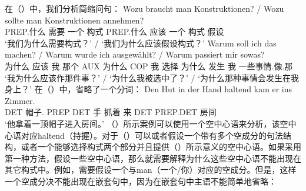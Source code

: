 \begin{exe}
\begin{xlist}[iv.]
\begin{exe}
\begin{xlist}[iv.]
\z
在（）中，我们分析简缩问句：
\eal
\ex 
\gll Wozu braucht man Konstruktionen? / Wozu sollte man Konstruktionen annehmen?\\
     PREP.什么 需要 一个 构式 {} PREP.什么 应该 一个 构式 假设\\
\glt `我们为什么需要构式？' / `我们为什么应该假设构式？'
\ex 
\gll Warum soll ich das machen? / Warum wurde ich ausgewählt? / Warum passiert mir sowas?\\
	 为什么 应该 我 那个 AUX {} 为什么 COP 我 选择 {} 为什么 发生 我 一些事情.像.那\\
\glt `我为什么应该作那件事？' / `为什么我被选中了？' / `为什么那种事情会发生在我身上？'
\zl
在（）中，省略了一个分词：
\ea
\gll Den Hut in der Hand haltend kam er ins Zimmer.\\
	 DET 帽子.\acc{} PREP DET 手 抓着 来 DET PREP.DET 房间\\
\glt `他拿着一顶帽子进入房间。'
\z
（）所示案例可以使用一个空中心语来分析，该空中心语对应haltend（持握）。对于（）可以或者假设一个带有多个空成分的句法结构，或者一个能够选择构式两个部分并且提供（）所示意义的空中心语。如果采用第一种方法，假设一些空中心语，那么就需要解释为什么这些空中心语不能出现在其它构式中。例如，需要假设一个与man（一个/你）对应的空成分。但是，这样一个空成分决不能出现在嵌套句中，因为在嵌套句中主语不能简单地省略：

\end{xlist}
\end{exe}
\end{xlist}
\end{exe}
